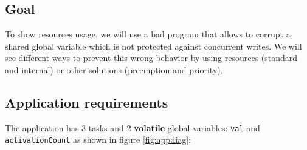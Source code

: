 \documentclass[11pt]{article}
\begin{document}
\subsection{Goal}

To show resources usage, we will use a bad program that allows to corrupt a shared global variable which is not protected against concurrent writes. We will see different ways to prevent this wrong behavior by using resources (standard and internal) or other solutions (preemption and priority).

\subsection{Application requirements}

The application has 3 tasks and 2 \textbf{volatile} global variables: \texttt{val} and \texttt{activationCount} as shown in figure \ref{fig:appdiag}:

\def\alarm#1#2{
  \node[alarm](#1) [#2] {};
  \coordinate (a) at ($(#1.north)$);
  \coordinate (b) at ($(#1.north east)$);
  \coordinate (c) at ($(#1.north west)$);
  \coordinate (d) at ($(#1)$);
  \draw[thick] ($(a)+(-0.1,0)$) rectangle ($(a)+(0.1,0.1)$);
  \draw[rotate=-45,thick] ($(b)+(-0.05,0)$) rectangle ($(b)+(0.05,0.1)$);
  \draw[rotate=45,thick] ($(c)+(-0.05,0)$) rectangle ($(c)+(0.05,0.1)$);
  \draw ($(d)+(0.3,0)$) -- (d) -- ($(d)+(0,0.3)$);
  \node [font=\scriptsize,below=0.5mm of #1] {{\em Alarm}}
}

\def\sharedvar#1#2#3{
  \node (#1) [#2] {#1};
  \coordinate (a) at ($(#1.north #3) + (0,0.2)$);
  \coordinate (b) at ($(#1.south #3) + (0,-0.2)$);
  \draw[ultra thick] (a) -- (b);
  \draw ($(a)+(-0.1,0)$) -- ($(a)+(0.1,0)$); 
  \draw ($(b)+(-0.1,0)$) -- ($(b)+(0.1,0)$) 
}

\def\varrect#1{
  \draw ($(#1.south west)$) rectangle ($(#1.north east)$)
}
\end{document}
